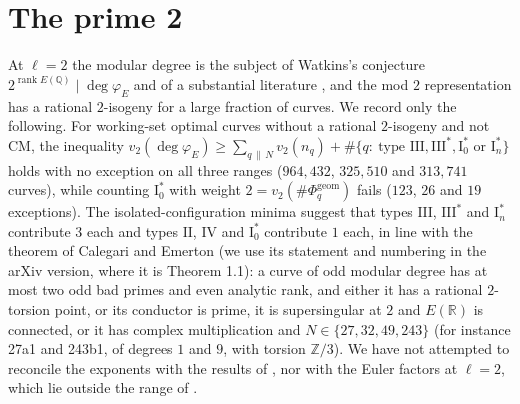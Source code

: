\documentclass[11pt]{amsart}
\theoremstyle{definition}
\newcommand{\Q}{\mathbb{Q}}
\newcommand{\Z}{\mathbb{Z}}
\newcommand{\R}{\mathbb{R}}
\newcommand{\degphi}{\deg\varphi_E}
\newcommand{\Phig}{\Phi^{\mathrm{geom}}}
\begin{document}
\section{The prime 2}\label{sec:two}
At $\ell=2$ the modular degree is the subject of Watkins's conjecture $2^{\operatorname{rank}E(\Q)}\mid\degphi$ \cite{Watkins02} and of a substantial literature \cite{Dummigan06,CalegariEmerton09,Yazdani11,CaroPasten22,HatleyKundu,BKP}, and the mod $2$ representation has a rational $2$-isogeny for a large fraction of curves. We record only the following. For working-set optimal curves without a rational $2$-isogeny and not CM, the inequality $v_2(\degphi)\ge\sum_{q\,\|\,N}v_2(n_q)+\#\{q:\ \text{type }\mathrm{III},\mathrm{III}^*,\mathrm{I}_0^*\text{ or }\mathrm{I}_n^*\}$ holds with no exception on all three ranges ($964{,}432$, $325{,}510$ and $313{,}741$ curves), while counting $\mathrm{I}_0^*$ with weight $2=v_2(\#\Phig_q)$ fails ($123$, $26$ and $19$ exceptions). The isolated-configuration minima suggest that types $\mathrm{III}$, $\mathrm{III}^*$ and $\mathrm{I}_n^*$ contribute $3$ each and types $\mathrm{II}$, $\mathrm{IV}$ and $\mathrm{I}_0^*$ contribute $1$ each, in line with the theorem of Calegari and Emerton \cite{CalegariEmerton09} (we use its statement and numbering in the arXiv version, where it is Theorem 1.1): a curve of odd modular degree has at most two odd bad primes and even analytic rank, and either it has a rational $2$-torsion point, or its conductor is prime, it is supersingular at $2$ and $E(\R)$ is connected, or it has complex multiplication and $N\in\{27,32,49,243\}$ (for instance 27a1 and 243b1, of degrees $1$ and $9$, with torsion $\Z/3$). We have not attempted to reconcile the exponents with the results of \cite{Dummigan06,CaroPasten22,HatleyKundu,BKP}, nor with the Euler factors at $\ell=2$, which lie outside the range of \cite{DFG04}.
\end{document}
